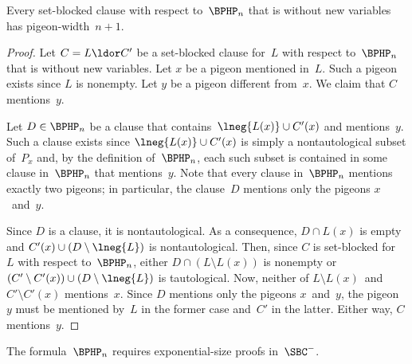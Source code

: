 \documentclass[10pt,a4paper]{article}
\begin{document}
\begin{lemma}\label{thm:SBC-width-lower-bound-for-BPHP}
  Every set-blocked clause with respect to~$\BPHP_n$
  that is without new variables has pigeon-width~$n + 1$.
\end{lemma}
\begin{proof}
  Let $C = L \ldor C'$ be a set-blocked clause for~$L$
  with respect to~$\BPHP_n$ that is without new variables.
  Let $x$ be a pigeon mentioned in~$L$.
  Such a pigeon exists since $L$ is nonempty.
  Let $y$ be a pigeon different from~$x$.
  We claim that $C$ mentions~$y$.

  Let $D \in \BPHP_n$ be a clause
  that contains~$\lneg{L(x)} \cup C'(x)$ and mentions~$y$.
  Such a clause exists since $\lneg{L(x)} \cup C'(x)$ is
  simply a nontautological subset of~$P_x$
  and, by the definition of~$\BPHP_n$,
  each such subset is contained in
  some clause in~$\BPHP_n$ that mentions~$y$.
  Note that every clause in~$\BPHP_n$ mentions exactly two pigeons;
  in particular, the clause~$D$ mentions only the pigeons $x$~and~$y$.

  Since $D$ is a clause, it is nontautological.
  As a consequence, $D \cap L(x)$ is empty
  and $C'(x) \cup (D \setminus \lneg{L})$ is nontautological.
  Then, since $C$ is set-blocked for~$L$ with respect to~$\BPHP_n$,
  either $D \cap (L \setminus L(x))$ is nonempty
  or $(C' \setminus C'(x)) \cup (D \setminus \lneg{L})$ is tautological.
  Now, neither of $L \setminus L(x)$~and~$C' \setminus C'(x)$ mentions~$x$.
  Since $D$ mentions only the pigeons $x$~and~$y$,
  the pigeon~$y$ must be mentioned by~$L$ in the former case and~$C'$ in the latter.
  Either way, $C$ mentions~$y$.
\end{proof}


\begin{theorem}\label{thm:SBC-size-lower-bound-for-BPHP}
  The formula~$\BPHP_n$ requires exponential-size proofs in~$\SBC^-$.
\end{theorem}
\end{document}
